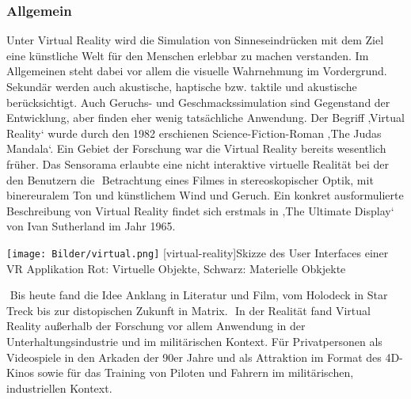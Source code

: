 \documentclass[12pt,a4paper,bibliography=totocnumbered,listof=totocnumbered]{scrartcl}
\begin{document}
\subsubsection{Allgemein}
Unter Virtual Reality wird die Simulation von Sinneseindrücken mit dem Ziel eine künstliche Welt für den Menschen erlebbar zu machen verstanden. Im Allgemeinen steht dabei vor allem die visuelle Wahrnehmung im Vordergrund. Sekundär werden auch akustische, haptische bzw. taktile und akustische berücksichtigt. Auch Geruchs- und Geschmackssimulation sind Gegenstand der Entwicklung, aber finden eher wenig tatsächliche Anwendung.
Der Begriff ‚Virtual Reality‘ wurde durch den 1982 erschienen Science-Fiction-Roman ‚The Judas Mandala‘. Ein Gebiet der Forschung war die Virtual Reality bereits wesentlich früher.
Das Sensorama erlaubte eine nicht interaktive virtuelle Realität bei der den Benutzern die  Betrachtung eines Filmes in stereoskopischer Optik, mit binereuralem Ton und künstlichem Wind und Geruch. Ein konkret ausformulierte Beschreibung von Virtual Reality findet sich erstmals in ‚The Ultimate Display‘ von Ivan Sutherland im Jahr 1965.

\begin{minipage}{\linewidth}
\vspace{1em}
	\centering
	\texttt{[image: Bilder/virtual.png]}
	[virtual-reality]{Skizze des User Interfaces einer VR Applikation\newline
	Rot: Virtuelle Objekte, Schwarz: Materielle Obkjekte}
	\label{fig:virtual_reality}
\vspace{1em}
\end{minipage}

 Bis heute fand die Idee Anklang in Literatur und Film, vom Holodeck in Star Treck bis zur distopischen Zukunft in Matrix.  In der Realität fand Virtual Reality außerhalb der Forschung vor allem Anwendung in der Unterhaltungsindustrie und im militärischen Kontext. Für Privatpersonen als Videospiele in den Arkaden der 90er Jahre und als Attraktion im Format des 4D-Kinos sowie für das Training von Piloten und Fahrern im militärischen, industriellen Kontext.
\end{document}
